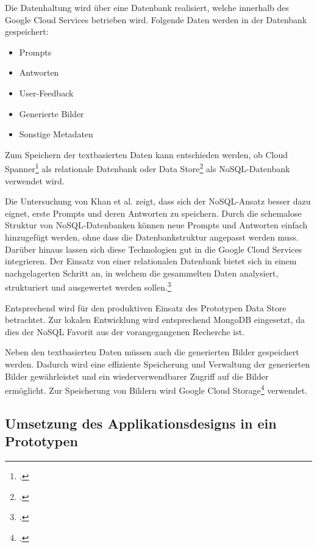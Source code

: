 Die Datenhaltung wird über eine Datenbank realisiert, welche innerhalb des Google Cloud Services betrieben wird.
Folgende Daten werden in der Datenbank gespeichert:
\begin{itemize}
    \item Prompts
    \item Antworten
    \item User-Feedback
    \item Generierte Bilder
    \item Sonstige Metadaten
\end{itemize}

Zum Speichern der textbasierten Daten kann entschieden werden, ob Cloud Spanner\footcite{google_spanner} als relationale Datenbank oder Data Store\footcite{google_datastore} als NoSQL-Datenbank verwendet wird.

Die Untersuchung von Khan et al. zeigt, dass sich der NoSQL-Ansatz besser dazu eignet, erste Prompts und deren Antworten zu speichern.
Durch die schemalose Struktur von NoSQL-Datenbanken können neue Prompts und Antworten einfach hinzugefügt werden, ohne dass die Datenbankstruktur angepasst werden muss.
Darüber hinaus lassen sich diese Technologien gut in die Google Cloud Services integrieren.
Der Einsatz von einer relationalen Datenbank bietet sich in einem nachgelagerten Schritt an, in welchem die gesammelten Daten analysiert, strukturiert und ausgewertet werden sollen.\footcite{Khan2022SQL}

Entsprechend wird für den produktiven Einsatz des Prototypen Data Store betrachtet.
Zur lokalen Entwicklung wird entsprechend MongoDB eingesetzt, da dies der NoSQL Favorit aus der vorangegangenen Recherche ist.

Neben den textbasierten Daten müssen auch die generierten Bilder gespeichert werden.
Dadurch wird eine effiziente Speicherung und Verwaltung der generierten Bilder gewährleistet und ein wiederverwendbarer Zugriff auf die Bilder ermöglicht.
Zur Speicherung von Bildern wird Google Cloud Storage\footcite{google_storage} verwendet.

\subsection{Umsetzung des Applikationsdesigns in ein Prototypen}\label{subsec:umsetzung-des-applikationsdesigns-in-ein-prototypen}







